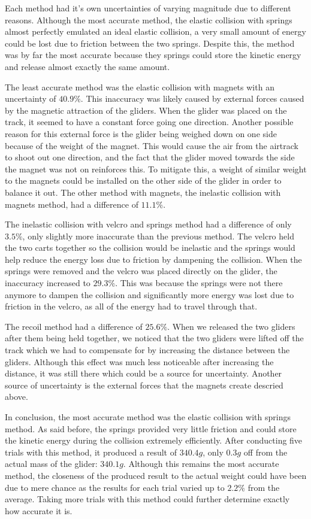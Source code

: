 \documentclass[12pt]{article}
\begin{document}
Each method had it's own uncertainties of varying magnitude due to different reasons. Although the most accurate method, the elastic collision with springs almost perfectly emulated an ideal elastic collision, a very small amount of energy could be lost due to friction between the two springs. Despite this, the method was by far the most accurate because they springs could store the kinetic energy and release almost exactly the same amount.

The least accurate method was the elastic collision with magnets with an uncertainty of $40.9\%$. This inaccuracy was likely caused by external forces caused by the magnetic attraction of the gliders. When the glider was placed on the track, it seemed to have a constant force going one direction. Another possible reason for this external force is the glider being weighed down on one side because of the weight of the magnet. This would cause the air from the airtrack to shoot out one direction, and the fact that the glider moved towards the side the magnet was not on reinforces this. To mitigate this, a weight of similar weight to the magnets could be installed on the other side of the glider in order to balance it out. The other method with magnets, the inelastic collision with magnets method, had a difference of $11.1\%$.

The inelastic collision with velcro and springs method had a difference of only $3.5\%$, only slightly more inaccurate than the previous method. The velcro held the two carts together so the collision would be inelastic and the springs would help reduce the energy loss due to friction by dampening the collision. When the springs were removed and the velcro was placed directly on the glider, the inaccuracy increased to $29.3\%$. This was because the springs were not there anymore to dampen the collision and significantly more energy was lost due to friction in the velcro, as all of the energy had to travel through that.

The recoil method had a difference of $25.6\%$. When we released the two gliders after them being held together, we noticed that the two gliders were lifted off the track which we had to compensate for by increasing the distance between the gliders. Although this effect was much less noticeable after increasing the distance, it was still there which could be a source for uncertainty. Another source of uncertainty is the external forces that the magnets create descried above.

In conclusion, the most accurate method was the elastic collision with springs method. As said before, the springs provided very little friction and could store the kinetic energy during the collision extremely efficiently. After conducting five trials with this method, it produced a result of $340.4g$, only $0.3g$ off from the actual mass of the glider: $340.1g$. Although this remains the most accurate method, the closeness of the produced result to the actual weight could have been due to mere chance as the results for each trial varied up to $2.2\%$ from the average. Taking more trials with this method could further determine exactly how accurate it is. 
\newpage
\appendix
\singlespacing
\end{document}
